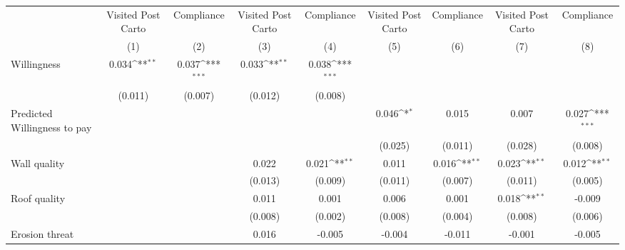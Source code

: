 {
\def\sym#1{\ifmmode^{#1}\else\(^{#1}\)\fi}
\begin{tabular}{l*{8}{c}}
\toprule
                &\multicolumn{1}{c}{Visited Post Carto}&\multicolumn{1}{c}{Compliance}&\multicolumn{1}{c}{Visited Post Carto}&\multicolumn{1}{c}{Compliance}&\multicolumn{1}{c}{Visited Post Carto}&\multicolumn{1}{c}{Compliance}&\multicolumn{1}{c}{Visited Post Carto}&\multicolumn{1}{c}{Compliance}\\
                &\multicolumn{1}{c}{(1)}         &\multicolumn{1}{c}{(2)}         &\multicolumn{1}{c}{(3)}         &\multicolumn{1}{c}{(4)}         &\multicolumn{1}{c}{(5)}         &\multicolumn{1}{c}{(6)}         &\multicolumn{1}{c}{(7)}         &\multicolumn{1}{c}{(8)}         \\
\midrule
Willingness     &    0.034\sym{**} &    0.037\sym{***}&    0.033\sym{**} &    0.038\sym{***}&                  &                  &                  &                  \\
                &  (0.011)         &  (0.007)         &  (0.012)         &  (0.008)         &                  &                  &                  &                  \\
Predicted Willingness to pay&                  &                  &                  &                  &    0.046\sym{*}  &    0.015         &    0.007         &    0.027\sym{***}\\
                &                  &                  &                  &                  &  (0.025)         &  (0.011)         &  (0.028)         &  (0.008)         \\
Wall quality    &                  &                  &    0.022         &    0.021\sym{**} &    0.011         &    0.016\sym{**} &    0.023\sym{**} &    0.012\sym{**} \\
                &                  &                  &  (0.013)         &  (0.009)         &  (0.011)         &  (0.007)         &  (0.011)         &  (0.005)         \\
Roof quality    &                  &                  &    0.011         &    0.001         &    0.006         &    0.001         &    0.018\sym{**} &   -0.009         \\
                &                  &                  &  (0.008)         &  (0.002)         &  (0.008)         &  (0.004)         &  (0.008)         &  (0.006)         \\
Erosion threat  &                  &                  &    0.016         &   -0.005         &   -0.004         &   -0.011         &   -0.001         &   -0.005         \\

\end{tabular}}
